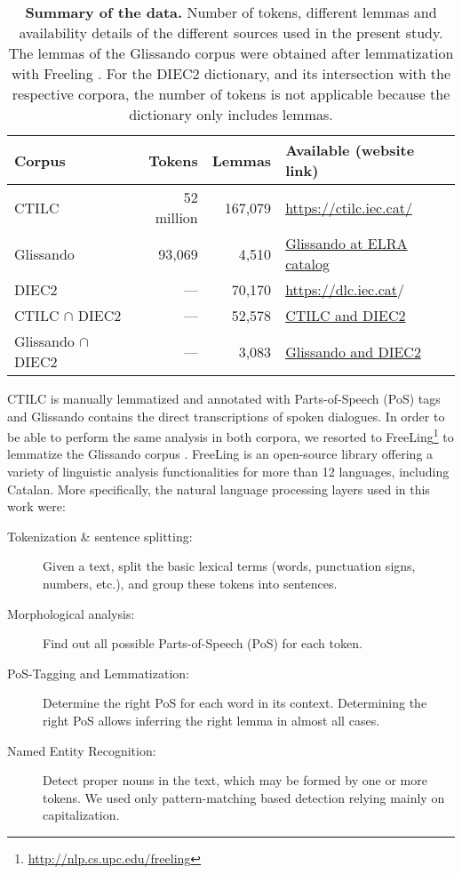 \documentclass[10pt,letterpaper]{article}
\begin{document}
\begin{table}[!ht]
\centering
\small
\begin{tabular}{l r r l}
\hline
\textbf{Corpus} & \textbf{Tokens} & \textbf{Lemmas} & \textbf{Available (website link)}\\
\hline
CTILC & 52 million & 167,079 & \href{https://ctilc.iec.cat/}{https://ctilc.iec.cat/} \\
Glissando & 93,069 & 4,510 & \href{http://catalog.elra.info/en-us/repository/browse/ELRA-S0407/}{Glissando at ELRA catalog} \\
\hline
DIEC2 & ---  & 70,170 & \href{https://dlc.iec.cat}{https://dlc.iec.cat}/ \\
CTILC $\cap$ DIEC2 & ---  & 52,578 & \href{https://zenodo.org/record/4120887/files/DIEC2_CTILC_senseCG.zip?download=1}{CTILC and DIEC2} \\
Glissando $\cap$ DIEC2 & ---  & 3,083 & \href{https://zenodo.org/record/4120887/files/DIEC2_GLISSANDO_senseCG.zip?download=1}{Glissando and DIEC2}\\
\hline
\end{tabular}
\caption{\textbf{Summary of the data.} Number of tokens, different lemmas and availability details of the different sources used in the present study. The lemmas of the Glissando corpus were obtained after lemmatization with Freeling \cite{Padro2012}. For the DIEC2 dictionary, and its intersection with the respective corpora, the number of tokens is not applicable because the dictionary only includes lemmas.} 
\label{table_lemmas}
\end{table}

CTILC is manually lemmatized and annotated with Parts-of-Speech (PoS) tags and Glissando contains the direct transcriptions of spoken dialogues. 
In order to be able to perform the same analysis in both corpora, we resorted to FreeLing\footnote{\href{http://nlp.cs.upc.edu/freeling}{http://nlp.cs.upc.edu/freeling}}  to lemmatize the Glissando corpus  \cite{Padro2012}.
FreeLing is an open-source library offering a variety of linguistic analysis functionalities for more than 12 languages, including Catalan. More specifically, the natural language processing layers used in this work were:
\begin{description}
\item[Tokenization \& sentence splitting:] Given a text, split the basic lexical terms (words, punctuation signs, numbers, etc.), and group these tokens into sentences.
\item[Morphological analysis:] Find out all possible Parts-of-Speech (PoS) for each token.
\item[PoS-Tagging and Lemmatization:] Determine the right PoS for each word in its context. Determining the right PoS allows inferring the right lemma in almost all cases.
\item[Named Entity Recognition:] Detect proper nouns in the text, which may be formed by one or more tokens. We used only pattern-matching based detection relying mainly on capitalization.
\end{description}
\end{document}
